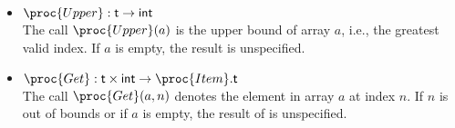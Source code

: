 \documentclass[11pt,a4paper]{article}
\newcommand\type[1]{\textsf{#1}}
\begin{document}
\begin{itemize}
\begin{itemize}
    \item \(\proc{Upper} : \type{t} \rightarrow \type{int}\)\\
    The call \(\proc{Upper} (a)\) is the upper bound of array
    \(a\), i.e., the greatest valid index. If \(a\) is empty, the
    result is unspecified.

    \item \(\proc{Get} : \type{t} \times \type{int} \rightarrow
    \proc{Item}.\type{t}\)\\
    The call \(\proc{Get} (a, n)\) denotes the element in
    array \(a\) at index \(n\). If \(n\) is out of bounds or if
    \(a\) is empty, the result of  is unspecified.

  \end{itemize}

\end{itemize}


\end{document}
